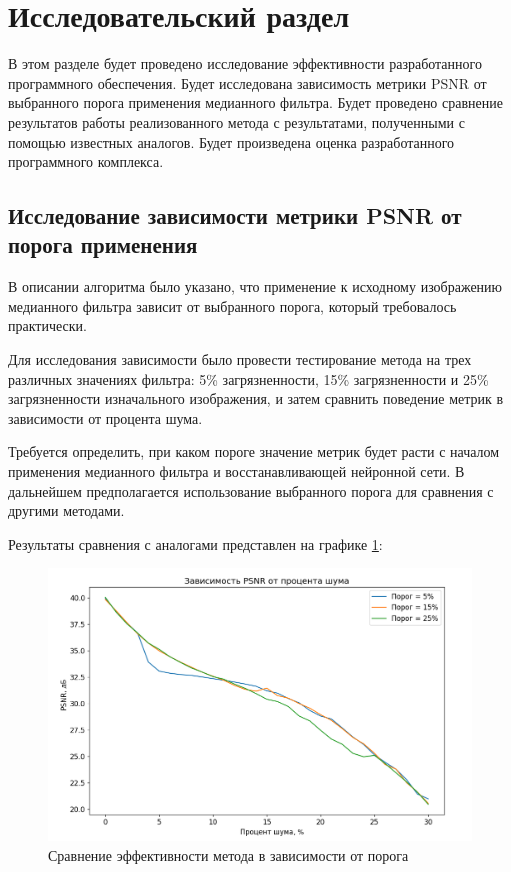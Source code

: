 \section{Исследовательский раздел}
В этом разделе будет проведено исследование эффективности разработанного программного обеспечения.
Будет исследована зависимость метрики PSNR от выбранного порога применения медианного фильтра.
Будет проведено сравнение результатов работы реализованного метода с результатами, полученными с помощью известных аналогов.
Будет произведена оценка разработанного программного комплекса.

\subsection{Исследование зависимости метрики PSNR от порога применения}
В описании алгоритма было указано, что применение к исходному изображению медианного фильтра зависит от выбранного порога, который требовалось практически.

Для исследования зависимости было провести тестирование метода на трех различных значениях фильтра: 5\% загрязненности, 15\% загрязненности и 25\% загрязненности изначального изображения, и затем сравнить поведение метрик в зависимости от процента шума.

Требуется определить, при каком пороге значение метрик будет расти с началом применения медианного фильтра и восстанавливающей нейронной сети.
В дальнейшем предполагается использование выбранного порога для сравнения с другими методами.

\newpage
Результаты сравнения с аналогами представлен на графике \ref{res::comp}:
\FloatBarrier
\begin{figure}[h]	
	\begin{center}
		\includegraphics[width=\linewidth]{inc/png/median1.png}
	\end{center}
	\captionsetup{justification=centering}
	\caption{Сравнение эффективности метода в зависимости от порога}
	\label{res::comp}
\end{figure}
\FloatBarrier

